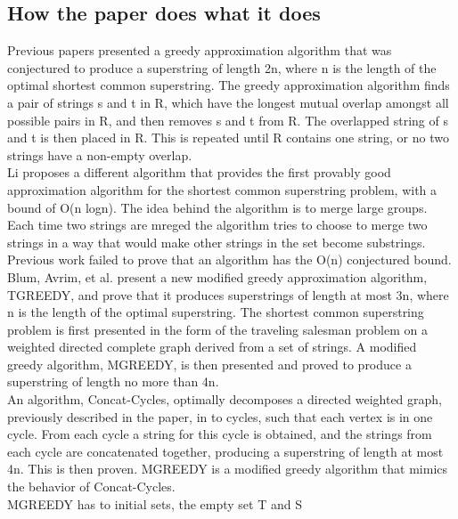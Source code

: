\documentclass[letterpaper,11pt,titlepage]{article}
\begin{document}
\subsection*{How the paper does what it does}
Previous papers \cite{tarhio1988greedy} \cite{turner1989approximation} presented a greedy approximation algorithm that was conjectured to produce a superstring of length 2n, where n is the length of the optimal shortest common superstring.  The greedy approximation algorithm finds a pair of strings s and t in R, which have the longest mutual overlap amongst all possible pairs in R, and then removes s and t from R.  The overlapped string of s and t is then placed in R.  This is repeated until R contains one string, or no two strings have a non-empty overlap. \cite{tarhio1988greedy} \\

Li \cite{li1990towards} proposes a different algorithm that provides the first provably good approximation algorithm for the shortest common superstring problem, with a bound of O(n logn).  The idea behind the algorithm is to merge large groups.  Each time two strings are mreged the algorithm tries to choose to merge two strings in a way that would make other strings in the set become substrings.  \\

Previous work failed to prove that an algorithm has the O(n) conjectured bound.  Blum, Avrim, et al. \cite{blum1991linear} present a new modified greedy approximation algorithm, TGREEDY, and prove that it produces superstrings of length at most 3n, where n is the length of the optimal superstring.  The shortest common superstring problem is first presented in the form of the traveling salesman problem on a weighted directed complete graph derived from a set of strings.  A modified greedy algorithm, MGREEDY, is then presented and proved to produce a superstring of length no more than 4n. \\

An algorithm, Concat-Cycles, optimally decomposes a directed weighted graph, previously described in the paper, in to cycles, such that each vertex is in one cycle.  From each cycle a string for this cycle is obtained, and the strings from each cycle are concatenated together, producing a superstring of length at most 4n.  This is then proven.  MGREEDY is a modified greedy algorithm that mimics the behavior of Concat-Cycles. \\
MGREEDY has to initial sets, the empty set T and S 
\end{document}
